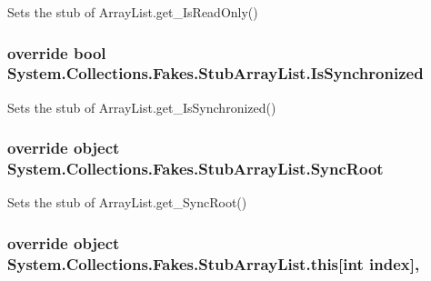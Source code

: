 Sets the stub of Array\-List.\-get\-\_\-\-Is\-Read\-Only()

\hypertarget{class_system_1_1_collections_1_1_fakes_1_1_stub_array_list_a0d3cd7a13570d80222a6c7193d957cfe}{
\subsubsection[{Is\-Synchronized}]{\setlength{\rightskip}{0pt plus 5cm}override bool System.\-Collections.\-Fakes.\-Stub\-Array\-List.\-Is\-Synchronized\hspace{0.3cm}{\ttfamily [get]}}}\label{class_system_1_1_collections_1_1_fakes_1_1_stub_array_list_a0d3cd7a13570d80222a6c7193d957cfe}


Sets the stub of Array\-List.\-get\-\_\-\-Is\-Synchronized()

\hypertarget{class_system_1_1_collections_1_1_fakes_1_1_stub_array_list_accbd3a916f314d4ad45dba7c97143064}{
\subsubsection[{Sync\-Root}]{\setlength{\rightskip}{0pt plus 5cm}override object System.\-Collections.\-Fakes.\-Stub\-Array\-List.\-Sync\-Root\hspace{0.3cm}{\ttfamily [get]}}}\label{class_system_1_1_collections_1_1_fakes_1_1_stub_array_list_accbd3a916f314d4ad45dba7c97143064}


Sets the stub of Array\-List.\-get\-\_\-\-Sync\-Root()

\hypertarget{class_system_1_1_collections_1_1_fakes_1_1_stub_array_list_ac7ac7e1b6c99115f1a2e29189322d2f0}{
\subsubsection[{this[int index]}]{\setlength{\rightskip}{0pt plus 5cm}override object System.\-Collections.\-Fakes.\-Stub\-Array\-List.\-this\mbox{[}int {\bf index}\mbox{]}\hspace{0.3cm}{\ttfamily [get]}, {\ttfamily [set]}}}\label{class_system_1_1_collections_1_1_fakes_1_1_stub_array_list_ac7ac7e1b6c99115f1a2e29189322d2f0}


